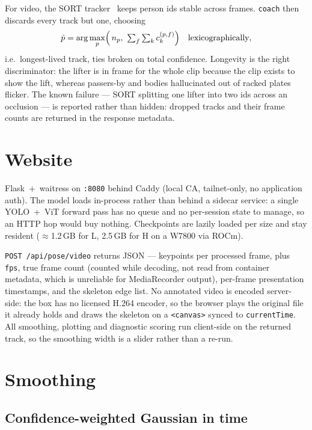 \documentclass[10pt,a4paper]{article}
\newcommand{\conf}{c}
\begin{document}
For video, the SORT tracker~\cite{sort} keeps person ids stable across frames.
\texttt{coach} then discards every track but one, choosing
\[
  \hat{p}=\arg\max_{p}\Bigl(\,n_p,\ \textstyle\sum_{f}\sum_{k}\conf_{k}^{(p,f)}\Bigr)
  \quad\text{lexicographically},
\]
i.e.\ longest-lived track, ties broken on total confidence. Longevity is the
right discriminator: the lifter is in frame for the whole clip because the clip
exists to show the lift, whereas passers-by and bodies hallucinated out of
racked plates flicker. The known failure --- SORT splitting one lifter into two
ids across an occlusion --- is reported rather than hidden: dropped tracks and
their frame counts are returned in the response metadata.

\section{Website}

Flask~+~waitress on \texttt{:8080} behind Caddy (local CA, tailnet-only, no
application auth). The model loads in-process rather than behind a sidecar
service: a single YOLO~+~ViT forward pass has no queue and no per-session state
to manage, so an HTTP hop would buy nothing. Checkpoints are lazily loaded per
size and stay resident ($\approx$1.2\,GB for L, 2.5\,GB for H on a W7800 via
ROCm).

\texttt{POST /api/pose/video} returns JSON --- keypoints per processed frame,
plus \texttt{fps}, true frame count (counted while decoding, not read from
container metadata, which is unreliable for MediaRecorder output), per-frame
presentation timestamps, and the skeleton edge list. No annotated video is
encoded server-side: the box has no licensed H.264 encoder, so the browser plays
the original file it already holds and draws the skeleton on a \texttt{<canvas>}
synced to \texttt{currentTime}. All smoothing, plotting and diagnostic scoring
run client-side on the returned track, so the smoothing width is a slider rather
than a re-run.

\section{Smoothing}\label{sec:smooth}

\subsection{Confidence-weighted Gaussian in time}
\end{document}
